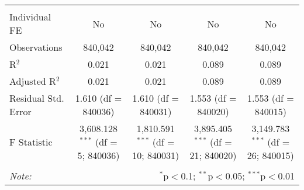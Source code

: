\documentclass[
]{article}
\begin{document}
\begin{table}[!htbp]
{\begin{tabular}{@{\extracolsep{5pt}}lcccc}
\hline \\[-1.8ex] 
Individual FE & No & No & No & No \\ 
Observations & 840,042 & 840,042 & 840,042 & 840,042 \\ 
R$^{2}$ & 0.021 & 0.021 & 0.089 & 0.089 \\ 
Adjusted R$^{2}$ & 0.021 & 0.021 & 0.089 & 0.089 \\ 
Residual Std. Error & 1.610 (df = 840036) & 1.610 (df = 840031) & 1.553 (df = 840020) & 1.553 (df = 840015) \\ 
F Statistic & 3,608.128$^{***}$ (df = 5; 840036) & 1,810.591$^{***}$ (df = 10; 840031) & 3,895.405$^{***}$ (df = 21; 840020) & 3,149.783$^{***}$ (df = 26; 840015) \\ 
\hline 
\hline \\[-1.8ex] 
\textit{Note:}  & \multicolumn{4}{r}{$^{*}$p$<$0.1; $^{**}$p$<$0.05; $^{***}$p$<$0.01} \\ 
\end{tabular}
} 
\end{table} 
\newpage
\end{document}
